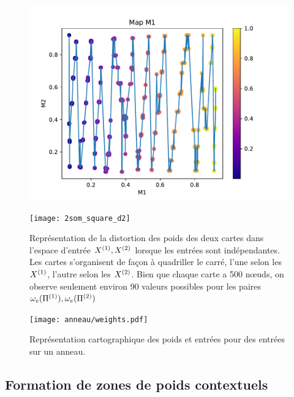 \documentclass[../main]{subfiles}
\begin{document}
\begin{figure}
	\begin{minipage}{0.48\textwidth}
		\includegraphics[width=\textwidth]{2som_square_d}
	\end{minipage}
	\begin{minipage}{0.48\textwidth}
		\texttt{[image: 2som\_square\_d2]}
	\end{minipage}
	\caption{Représentation de la distortion des poids des deux cartes dans l'espace d'entrée $X^{({1})}, X^{({2})}$ lorsque les entrées sont indépendantes. Les cartes s'organisent de façon à quadriller le carré, l'une selon les $X^{({1})}$, l'autre selon les $X^{({2})}$. Bien que chaque carte a 500 n\oe{}uds, on observe seulement environ 90 valeurs possibles pour les paires $\omega_e(\Pi^{({1})}),\omega_e(\Pi^{({2})})$ \label{2som_p_d}}
\end{figure}
\begin{figure}
	\centering\texttt{[image: anneau/weights.pdf]}
	\caption{Représentation cartographique des poids et entrées pour des entrées sur un anneau. \label{fig:anneau_w}}
\end{figure}

\subsection{Formation de zones de poids contextuels}
\end{document}
